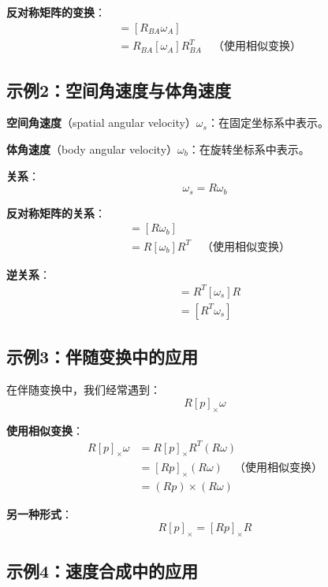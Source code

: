 \documentclass[12pt,a4paper]{article}
\begin{document}
\textbf{反对称矩阵的变换}：
\begin{align}
[\omega_B] &= [R_{BA} \omega_A] \\
&= R_{BA} [\omega_A] R_{BA}^T \quad \text{（使用相似变换）}
\end{align}

\subsection{示例2：空间角速度与体角速度}

\textbf{空间角速度}（spatial angular velocity）$\omega_s$：在固定坐标系中表示。

\textbf{体角速度}（body angular velocity）$\omega_b$：在旋转坐标系中表示。

\textbf{关系}：
\begin{equation}
\omega_s = R \omega_b
\end{equation}

\textbf{反对称矩阵的关系}：
\begin{align}
[\omega_s] &= [R \omega_b] \\
&= R [\omega_b] R^T \quad \text{（使用相似变换）}
\end{align}

\textbf{逆关系}：
\begin{align}
[\omega_b] &= R^T [\omega_s] R \\
&= [R^T \omega_s]
\end{align}

\subsection{示例3：伴随变换中的应用}

在伴随变换中，我们经常遇到：
\begin{equation}
R [p]_{\times} \omega
\end{equation}

\textbf{使用相似变换}：
\begin{align}
R [p]_{\times} \omega &= R [p]_{\times} R^T (R \omega) \\
&= [R p]_{\times} (R \omega) \quad \text{（使用相似变换）} \\
&= (R p) \times (R \omega)
\end{align}

\textbf{另一种形式}：
\begin{equation}
R [p]_{\times} = [R p]_{\times} R
\end{equation}

\subsection{示例4：速度合成中的应用}
\end{document}
